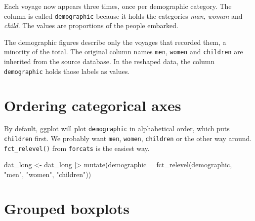 \documentclass[
  english,
  letterpaper,
]{book}
\newenvironment{Shaded}{\begin{snugshade}}{\end{snugshade}}
\newcommand{\AttributeTok}[1]{\textcolor[rgb]{0.40,0.45,0.13}{#1}}
\newcommand{\FunctionTok}[1]{\textcolor[rgb]{0.28,0.35,0.67}{#1}}
\newcommand{\NormalTok}[1]{\textcolor[rgb]{0.00,0.23,0.31}{#1}}
\newcommand{\OtherTok}[1]{\textcolor[rgb]{0.00,0.23,0.31}{#1}}
\newcommand{\SpecialCharTok}[1]{\textcolor[rgb]{0.37,0.37,0.37}{#1}}
\newcommand{\StringTok}[1]{\textcolor[rgb]{0.13,0.47,0.30}{#1}}
\begin{document}
Each voyage now appears three times, once per demographic category. The
column is called \texttt{demographic} because it holds the categories
\emph{man}, \emph{woman} and \emph{child}. The values are proportions of
the people embarked.

\begin{tcolorbox}[enhanced jigsaw, colframe=quarto-callout-note-color-frame, breakable, left=2mm, leftrule=.75mm, toptitle=1mm, rightrule=.15mm, opacitybacktitle=0.6, arc=.35mm, colback=white, title=\textcolor{quarto-callout-note-color}{\faInfo}\hspace{0.5em}{Note}, coltitle=black, colbacktitle=quarto-callout-note-color!10!white, toprule=.15mm, bottomtitle=1mm, opacityback=0, titlerule=0mm, bottomrule=.15mm]

The demographic figures describe only the voyages that recorded them, a
minority of the total. The original column names \texttt{men},
\texttt{women} and \texttt{children} are inherited from the source
database. In the reshaped data, the column \texttt{demographic} holds
those labels as values.

\end{tcolorbox}

\section{Ordering categorical axes}\label{ordering-categorical-axes}

By default, ggplot will plot \texttt{demographic} in alphabetical order,
which puts \texttt{children} first. We probably want \texttt{men},
\texttt{women}, \texttt{children} or the other way around.
\texttt{fct\_relevel()} from \texttt{forcats} is the easiest way.

\begin{Shaded}
\begin{Highlighting}[]
\NormalTok{dat\_long }\OtherTok{\textless{}{-}}\NormalTok{ dat\_long }\SpecialCharTok{|\textgreater{}}
  \FunctionTok{mutate}\NormalTok{(}\AttributeTok{demographic =} \FunctionTok{fct\_relevel}\NormalTok{(demographic, }\StringTok{"men"}\NormalTok{, }\StringTok{"women"}\NormalTok{, }\StringTok{"children"}\NormalTok{))}
\end{Highlighting}
\end{Shaded}

\section{Grouped boxplots}\label{grouped-boxplots}
\end{document}
